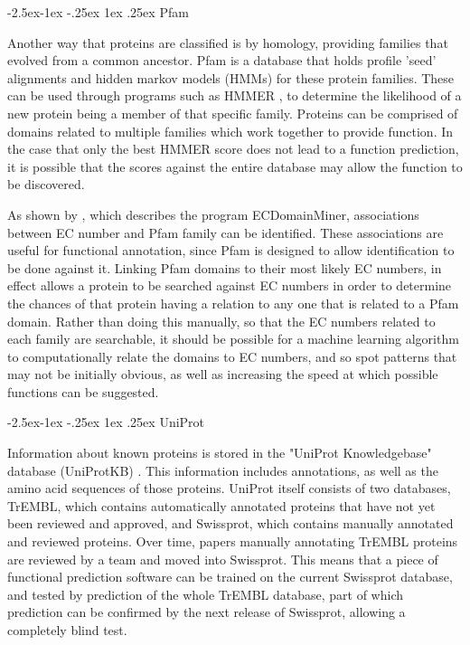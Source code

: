 \documentclass[12pt]{article}
\makeatletter
\renewcommand\subsubsection{\@startsection{subsubsection}{4}{\z@}
            {-2.5ex\@plus -1ex \@minus -.25ex}
            {1ex \@plus .25ex}
            {\normalfont\large\bfseries}}
\makeatother
\begin{document}
			\subsubsection{Pfam}

			Another way that proteins are classified is by homology, providing families that evolved from a common ancestor.  Pfam \citep{RefWorks:doc:5d6e641de4b0a51fb0eed90f} is a database that holds profile 'seed' alignments and hidden markov models (HMMs) for these protein families.  These can be used through programs such as HMMER \citep{RefWorks:doc:5c8f77ece4b077fbbf563f6a}, to determine the likelihood of a new protein being a member of that specific family. Proteins can be comprised of domains related to multiple families which work together to provide function.  In the case that only the best HMMER score does not lead to a function prediction, it is possible that the scores against the entire database may allow the function to be discovered.
					
			As shown by \cite{RefWorks:doc:5d6f9c26e4b0ec3eed182252}, which describes the program ECDomainMiner, associations between EC number and Pfam family can be identified.  These associations are useful for functional annotation, since Pfam is designed to allow identification to be done against it.  Linking Pfam domains to their most likely EC numbers, in effect allows a protein to be searched against EC numbers in order to determine the chances of that protein having a relation to any one that is related to a Pfam domain.  Rather than doing this manually, so that the EC numbers related to each family are searchable, it should be possible for a machine learning algorithm to computationally relate the domains to EC numbers, and so spot patterns that may not be initially obvious, as well as increasing the speed at which possible functions can be suggested.
			
			\subsubsection{UniProt}
		
			Information about known proteins is stored in the "UniProt Knowledgebase" database (UniProtKB) \citep{RefWorks:doc:5d80d882e4b074875bbeabb7}.  This information includes annotations, as well as the amino acid sequences of those proteins.  UniProt itself consists of two databases, TrEMBL, which contains automatically annotated proteins that have not yet been reviewed and approved, and Swissprot, which contains manually annotated and reviewed proteins.  Over time, papers manually annotating TrEMBL proteins are reviewed by a team and moved into Swissprot.  This means that a piece of functional prediction software can be trained on the current Swissprot database, and tested by prediction of the whole TrEMBL database, part of which prediction can be confirmed by the next release of Swissprot, allowing a completely blind test. 
			
\end{document}

